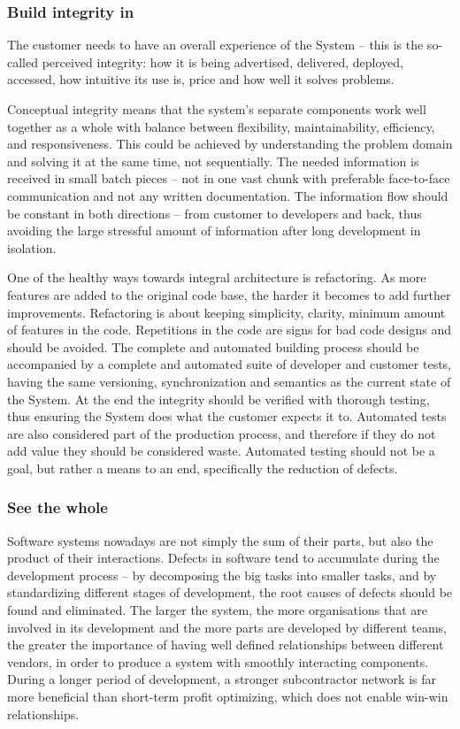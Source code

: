\subsubsection{Build integrity in}

The customer needs to have an overall experience of the System – this is the so-called perceived integrity: how it is being advertised, delivered, deployed, accessed, how intuitive its use is, price and how well it solves problems.

Conceptual integrity means that the system’s separate components work well together as a whole with balance between flexibility, maintainability, efficiency, and responsiveness. This could be achieved by understanding the problem domain and solving it at the same time, not sequentially. The needed information is received in small batch pieces – not in one vast chunk with preferable face-to-face communication and not any written documentation. The information flow should be constant in both directions – from customer to developers and back, thus avoiding the large stressful amount of information after long development in isolation.

One of the healthy ways towards integral architecture is refactoring. As more features are added to the original code base, the harder it becomes to add further improvements. Refactoring is about keeping simplicity, clarity, minimum amount of features in the code. Repetitions in the code are signs for bad code designs and should be avoided. The complete and automated building process should be accompanied by a complete and automated suite of developer and customer tests, having the same versioning, synchronization and semantics as the current state of the System. At the end the integrity should be verified with thorough testing, thus ensuring the System does what the customer expects it to. Automated tests are also considered part of the production process, and therefore if they do not add value they should be considered waste. Automated testing should not be a goal, but rather a means to an end, specifically the reduction of defects.

\subsubsection{See the whole}

Software systems nowadays are not simply the sum of their parts, but also the product of their interactions. Defects in software tend to accumulate during the development process – by decomposing the big tasks into smaller tasks, and by standardizing different stages of development, the root causes of defects should be found and eliminated. The larger the system, the more organisations that are involved in its development and the more parts are developed by different teams, the greater the importance of having well defined relationships between different vendors, in order to produce a system with smoothly interacting components. During a longer period of development, a stronger subcontractor network is far more beneficial than short-term profit optimizing, which does not enable win-win relationships.

